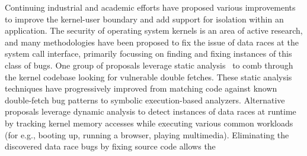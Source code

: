 Continuing industrial and academic efforts have proposed various 
improvements to improve the kernel-user boundary and add support for 
isolation within an application.
The security of operating system kernels is an area of active research, and 
many
methodologies have been proposed to fix the issue of data races at the system
call interface, primarily focussing on finding and fixing instances of this 
class of bugs.
One group of proposals leverage 
static analysis~\cite{dftinker, wang2017double, wang2019dftracker, deadline}
to comb through the 
kernel codebase looking for vulnerable double fetches.
These static analysis techniques have progressively improved
from matching code against known double-fetch bug patterns to
symbolic execution-based analyzers.
Alternative proposals
leverage dynamic analysis to detect instances of data races at 
runtime~\cite{jurczyk2013bochspwn, schwartzDECAF, wilhelm2016xenpwn}
by tracking kernel memory accesses while executing various common 
workloads (for e.g., booting up, running a browser, playing multimedia).
Eliminating the discovered data race bugs by fixing source code allows the
